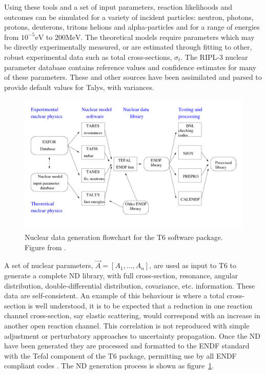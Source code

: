 Using these tools and a set of input parameters, reaction likelihoods and outcomes can be simulated for a variety of incident particles: neutron, photons, protons, deuterons, tritons helions and alpha-particles and for a range of energies from $10^{-5}\mathrm{eV}$ to $200\mathrm{MeV}$. The theoretical models require parameters which may be directly experimentally measured, or are estimated through fitting to other, robust experimental data such as total cross-sections, $\sigma_{t}$. The RIPL-3 nuclear parameter database \cite{Capote2009} contains reference values and confidence estimates for many of these parameters. These and other sources have been assimilated and parsed to provide default values for Talys, with variances. 

\begin{figure}
  \centering
  \includegraphics[width=\textwidth]{t6_flow.png}
  \caption{Nuclear data generation flowchart for the T6 software package. Figure from \cite{Koning2013}.}
  \label{fig:t6_overview}
\end{figure}

A set of nuclear parameters, $\vec{A} = [A_{1},\ldots,A_{n}]$, are used as input to T6 to generate a complete ND library, with full cross-section, resonance, angular distribution, double-differential distribution, covariance, etc. information. These data are self-consistent. An example of this behaviour is where a total cross-section is well understood, it is to be expected that a reduction in one reaction channel cross-section, say elastic scattering, would correspond with an increase in another open reaction channel. This correlation is not reproduced with simple adjustment or perturbatory approaches to uncertainty propagation. Once the ND have been generated they are processed and formatted to the ENDF standard with the Tefal component of the T6 package, permitting use by all ENDF compliant codes \cite{Koning2012}. The ND generation process is shown as figure~\ref{fig:t6_overview}.

